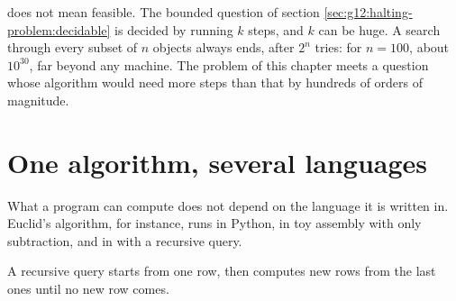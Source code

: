  does not mean feasible. The bounded question of section \ref{sec:g12:halting-problem:decidable} is decided
by running $k$ steps, and $k$ can be huge. A search through every subset of $n$ objects always ends, after $2^n$
tries: for $n = 100$, about $10^{30}$, far beyond any machine. The problem of this chapter meets a  question
whose algorithm would need more steps than that by hundreds of orders of magnitude.

\section{One algorithm, several languages}\label{sec:g12:halting-problem:languages}

What a program can compute does not depend on the language it is written in. Euclid's algorithm, for instance, runs
in Python, in toy assembly with only subtraction, and in  with a recursive query.

\label{lst:g12:halting-problem:euclid-py}

\label{out:g12:halting-problem:euclid-py}

\label{lst:g12:halting-problem:euclid-toy}

\label{out:g12:halting-problem:euclid-toy}

A recursive query starts from one row, then computes new rows from the last ones until no new row comes.

\label{out:g12:halting-problem:euclid-sql}


